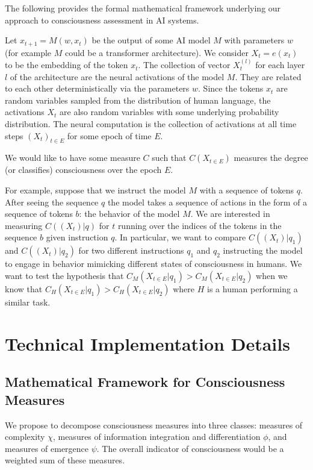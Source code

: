 \documentclass[11pt,a4paper]{article}
\begin{document}
The following provides the formal mathematical framework underlying our approach to consciousness assessment in AI systems.

Let $x_{t+1} = M(w, x_t)$ be the output of some AI model $M$ with parameters $w$ (for example $M$ could be a transformer architecture). We consider $X_t = e(x_t)$ to be the embedding of the token $x_t$. The collection of vector $X^{(l)}_t$ for each layer $l$ of the architecture are the neural activations of the model $M$. They are related to each other deterministically via the parameters $w$. Since the tokens $x_t$ are random variables sampled from the distribution of human language, the activations $X_t$ are also random variables with some underlying probability distribution. The neural computation is the collection of activations at all time steps $(X_t)_{t\in E}$ for some epoch of time $E$.

We would like to have some measure $C$ such that $C(X_{t\in E})$ measures the degree (or classifies) consciousness over the epoch $E$.

For example, suppose that we instruct the model $M$ with a sequence of tokens $q$. After seeing the sequence $q$ the model takes a sequence of actions in the form of a sequence of tokens $b$: the behavior of the model $M$. We are interested in measuring $C((X_t)|q)$ for $t$ running over the indices of the tokens in the sequence $b$ given instruction $q$. In particular, we want to compare $C((X_t)|q_1)$ and $C((X_t)|q_2)$ for two different instructions $q_1$ and $q_2$ instructing the model to engage in behavior mimicking different states of consciousness in humans. We want to test the hypothesis that $C_M(X_{t\in E}|q_1) > C_M(X_{t\in E}|q_2)$ when we know that $C_H(X_{t\in E}|q_1) > C_H(X_{t\in E}|q_2)$ where $H$ is a human performing a similar task.

\section{Technical Implementation Details}

\subsection{Mathematical Framework for Consciousness Measures}

We propose to decompose consciousness measures into three classes: measures of complexity $\chi$, measures of information integration and differentiation $\phi$, and measures of emergence $\psi$. The overall indicator of consciousness would be a weighted sum of these measures.
\end{document}
